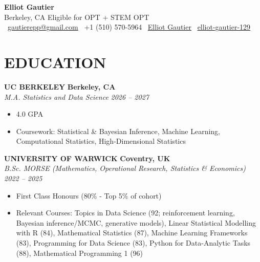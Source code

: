 \documentclass[10pt,a4paper]{article}
\begin{document}

\begin{center}
    {\LARGE \textbf{Elliot Gautier}} \\[3pt]
    Berkeley, CA \quad \textbar{} \quad
    Eligible for OPT + STEM OPT \\[2pt]
    \faEnvelope\ \href{mailto:gautierepp@gmail.com}{gautierepp@gmail.com} \quad \textbar{} \quad
    \faPhone\ +1 (510) 570-5964 \quad \textbar{} \quad
    \faLinkedin\ \href{https://www.linkedin.com/in/elliot-gautier-b2aaa3256}{Elliot Gautier} \quad \textbar{} \quad
    \faGithub\ \href{https://github.com/elliot-gautier-129}{elliot-gautier-129}
\end{center}


\section*{EDUCATION}

\textbf{UC BERKELEY} \hfill \textbf{Berkeley, CA}\\
\textit{M.A. Statistics and Data Science} \hfill \textit{2026 -- 2027}
\begin{itemize}
    \item 4.0 GPA

    \item Coursework: Statistical \& Bayesian Inference, Machine Learning, Computational Statistics, High-Dimensional Statistics
\end{itemize}

\textbf{UNIVERSITY OF WARWICK} \hfill \textbf{Coventry, UK}\\
\textit{B.Sc. MORSE (Mathematics, Operational Research, Statistics \& Economics)} \hfill \textit{2022 -- 2025}
\begin{itemize}
    \item First Class Honours (80\% - Top 5\% of cohort)

    \item Relevant Courses: Topics in Data Science (92; reinforcement learning, Bayesian inference/MCMC, generative models), Linear Statistical Modelling with R (84), Mathematical Statistics (87), Machine Learning Frameworks (83), Programming for Data Science (83), Python for Data-Analytic Tasks (88), Mathematical Programming 1 (96)
\end{itemize}
\end{document}
